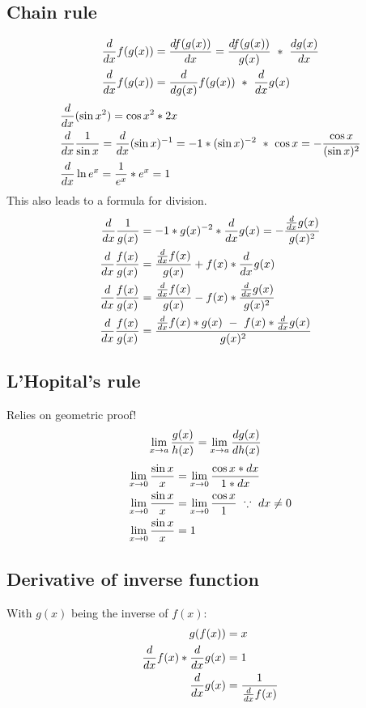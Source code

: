 \documentclass[a4paper,14pt,twoside]{book}
\begin{document}
{\subsection{Chain rule}
\begin{align*}
	\frac{d}{dx} f(g(x)) &= \frac{df(g(x))}{dx} = \frac{df(g(x))}{g(x)} \  * \  \frac{dg(x)}{dx} \\
	\frac{d}{dx} f(g(x)) &= \frac{d }{d g(x)} f(g(x)) \  * \  \frac{d }{d x} g(x) \\
\end{align*}
\begin{align*}
	&\frac{d}{dx} (\sin{x^2}) = \cos{x^2} * 2x \\
	&\frac{d}{dx} \frac{1}{\sin{x}} = \frac{d}{dx} (\sin x)^{-1} = -1*(\sin{x})^{-2} \  * \  \cos{x} = -\frac{\cos{x}}{(\sin{x})^2} \\
	&\frac{d}{dx} \ln e^x = \frac{1}{e^x} * e^x = 1
\end{align*}
\newpage
This also leads to a formula for division. \\
\begin{align*}
	\frac{d}{dx} \frac{1}{g(x)}    &= -1*g(x)^{-2} * \frac{d}{dx} g(x) = -\frac{\frac{d}{dx} g(x)}{g(x)^2} \\
	\frac{d}{dx} \frac{f(x)}{g(x)} &= \frac{\frac{d}{dx} f(x)}{g(x)} + f(x) * \frac{d}{dx} g(x) \\
	\frac{d}{dx} \frac{f(x)}{g(x)} &= \frac{\frac{d}{dx} f(x)}{g(x)} - f(x)*\frac{\frac{d}{dx} g(x)}{g(x)^2} \\
	\frac{d}{dx} \frac{f(x)}{g(x)} &= \frac{\frac{d}{dx} f(x) * g(x) \  - \  f(x) * \frac{d}{dx} g(x)}{g(x)^2} \\
\end{align*}
\subsection{L'Hopital's rule}
Relies on geometric proof!
\begin{align*}
	&\lim_{x \to a} \frac{g(x)}{h(x)} = \lim_{x \to a} \frac{dg(x)}{dh(x)}
\end{align*}
\begin{align*}
	\lim_{x \to 0} \frac{\sin{x}}{x} &= \lim_{x \to 0} \frac{\cos{x * dx}}{1 * dx} \\
	\lim_{x \to 0} \frac{\sin{x}}{x} &= \lim_{x \to 0} \frac{\cos{x}}{1} \  \because \  dx \ne 0 \\
	\lim_{x \to 0} \frac{\sin{x}}{x} &= 1
\end{align*}
\subsection{Derivative of inverse function}
With $g(x)$ being the inverse of $f(x):$
\begin{align*}
	g(f(x))           &= x \\
	\frac{d}{dx} f(x) * \frac{d}{dx} g(x) &= 1 \\
	\frac{d}{dx} g(x)           &= \frac{1}{\frac{d}{dx} f(x)} \\
\end{align*}
}
\end{document}
